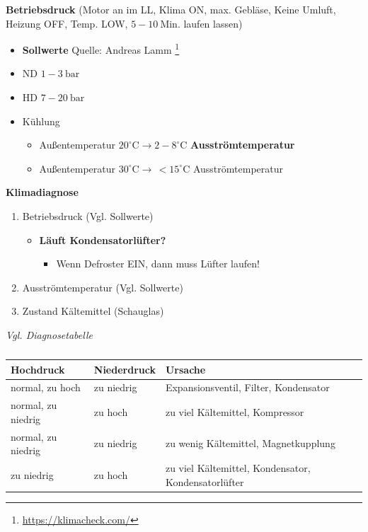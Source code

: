 \textbf{Betriebsdruck} (Motor an im LL, Klima ON, max. Gebläse, Keine
Umluft, Heizung OFF, Temp. LOW, $5 - 10~\text{Min.}$ laufen lassen)

\begin{itemize}
\item
  \textbf{Sollwerte} Quelle: Andreas Lamm \footnote{\url{https://klimacheck.com/}}
\item
  ND $1 - 3~\text{bar}$
\item
  HD $7 - 20~\text{bar}$
\item
  Kühlung

  \begin{itemize}
  \item
    Außentemperatur $20^\circ \text{C} \to 2 - 8^\circ \text{C}$
    \textbf{Ausströmtemperatur}
  \item
    Außentemperatur $30^\circ \text{C} \to \, <15^\circ \text{C}$
    Ausströmtemperatur
  \end{itemize}
\end{itemize}

\textbf{Klimadiagnose}

\begin{enumerate}
\item
  Betriebsdruck (Vgl. Sollwerte)

  \begin{itemize}
  \item
    \textbf{Läuft Kondensatorlüfter?}

    \begin{itemize}
    \item
      Wenn Defroster EIN, dann muss Lüfter laufen!
    \end{itemize}
  \end{itemize}
\item
  Ausströmtemperatur (Vgl. Sollwerte)
\item
  Zustand Kältemittel (Schauglas)
\end{enumerate}

\emph{Vgl. Diagnosetabelle}

\begin{table}[!ht]%
\centering 
	\caption{}%
\begin{tabular}{@{}lll@{}}
\hline
\textbf{Hochdruck} & \textbf{Niederdruck} & \textbf{Ursache} \\
\hline
normal, zu hoch & zu niedrig & Expansionsventil, Filter, Kondensator \\
normal, zu niedrig & zu hoch & zu viel Kältemittel, Kompressor \\
normal, zu niedrig & zu niedrig & zu wenig Kältemittel,
Magnetkupplung \\
zu niedrig & zu hoch & zu viel Kältemittel, Kondensator,
Kondensatorlüfter \\
\hline
\end{tabular} 
\end{table}

